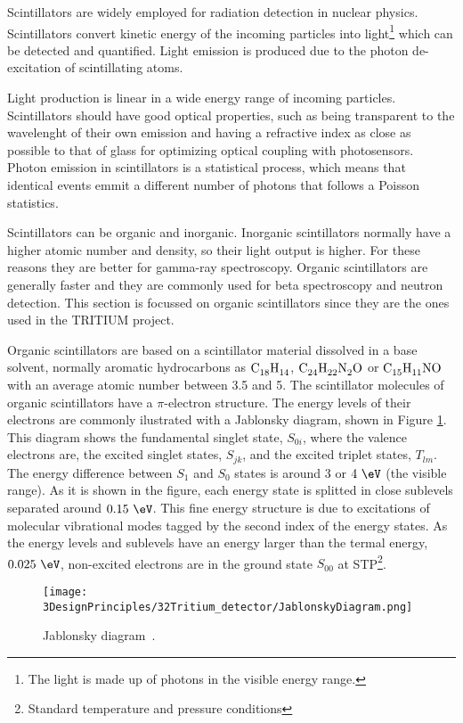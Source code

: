Scintillators are widely employed for radiation detection in nuclear physics. Scintillators convert kinetic energy of the incoming particles into light\footnote{The light is made up of photons in the visible energy range.} which can be detected and quantified. Light emission is produced due to the photon de-excitation of scintillating atoms.

Light production is linear in a wide energy range of incoming particles. Scintillators should have good optical properties, such as being transparent to the wavelenght of their own emission and having a refractive index as close as possible to that of glass for optimizing optical coupling with photosensors. Photon emission in scintillators is a statistical process, which means that identical events emmit a different number of photons that follows a Poisson statistics.

Scintillators can be organic and inorganic. Inorganic scintillators normally have a higher atomic number and density, so their light output is higher. For these reasons they are better for gamma-ray spectroscopy. Organic scintillators are generally faster and they are commonly used for beta spectroscopy and neutron detection. This section is focussed on organic scintillators since they are the ones used in the TRITIUM project. 

Organic scintillators are based on a scintillator material dissolved in a base solvent, normally aromatic hydrocarbons as $\ce{C_{18}H_{14}}$, $\ce{C_{24}H_{22}N_{2}O}$ or $\ce{C_{15}H_{11}NO}$ with an average atomic number between 3.5 and 5. The scintillator molecules of organic scintillators have a $\pi$-electron structure. The energy levels of their electrons are commonly ilustrated with a Jablonsky diagram, shown in Figure \ref{fig:JablonskyDiagram}. This diagram shows the fundamental singlet state, $S_{0i}$, where the valence electrons are, the excited singlet states, $S_{jk}$, and the excited triplet states, $T_{lm}$. The energy difference between $S_1$ and $S_0$ states is around $3$ or $4~\eV$ (the visible range). As it is shown in the figure, each energy state is splitted in close sublevels separated around $0.15~\eV$. This fine energy structure is due to excitations of molecular vibrational modes tagged by the second index of the energy states. As the energy levels and sublevels have an energy larger than the termal energy, $0.025~\eV$, non-excited electrons are in the ground state $S_{00}$ at STP\footnote{Standard temperature and pressure conditions}.

\begin{figure}[htbp]
\centering
\texttt{[image: 3DesignPrinciples/32Tritium\_detector/JablonskyDiagram.png]}
\caption{Jablonsky diagram\label{fig:JablonskyDiagram}~\cite{Knoll}.}
\end{figure}

